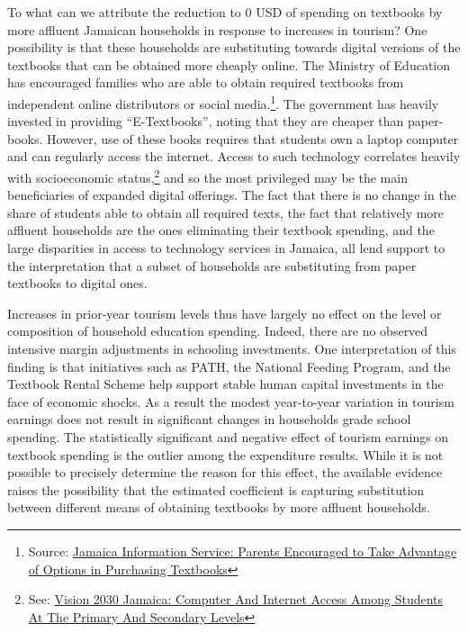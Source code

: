 \documentclass[12pt]{article}
\renewcommand\footnotesize{\fontsize{11}{13}\selectfont}
\begin{document}
   To what can we attribute the reduction to 0 USD of spending on textbooks by more affluent Jamaican households in response to increases in tourism? One possibility is that these households are substituting towards digital versions of the textbooks that can be obtained more cheaply online. The Ministry of Education has encouraged families who are able to obtain required textbooks from independent online distributors or social media.\footnote{\footnotesize Source: \href{https://jis.gov.jm/parents-encouraged-to-take-advantage-of-options-in-purchasing-textbooks/}{Jamaica Information Service: Parents Encouraged to Take Advantage of Options in Purchasing Textbooks}}. The government has heavily invested in providing ``E-Textbooks'', noting that they are cheaper than paper-books. However, use of these books requires that students own a laptop computer and can regularly access the internet. Access to such technology correlates heavily with socioeconomic status,\footnote{\footnotesize See: \href{https://www.vision2030.gov.jm/blog/computer-and-internet-access-among-students-at-the-primary-and-secondary-levels-november-2020/}{Vision 2030 Jamaica: Computer And Internet Access Among Students At The Primary And Secondary Levels}} and so the most privileged may be the main beneficiaries of expanded digital offerings. The fact that there is no change in the share of students able to obtain all required texts, the fact that relatively more affluent households are the ones eliminating their textbook spending, and the large disparities in access to technology services in Jamaica, all lend support to the interpretation that a subset of households are substituting from paper textbooks to digital ones. 
   
   Increases in prior-year tourism levels thus have largely no effect on the level or composition of household education spending. Indeed, there are no observed intensive margin adjustments in schooling investments. One interpretation of this finding is that initiatives such as PATH, the National Feeding Program, and the Textbook Rental Scheme help support stable human capital investments in the face of economic shocks. As a result the modest year-to-year variation in tourism earnings does not result in significant changes in households grade school spending. The statistically significant and negative effect of tourism earnings on textbook spending is the outlier among the expenditure results. While it is not possible to precisely determine the reason for this effect, the available evidence raises the possibility that the estimated coefficient is capturing substitution between different means of obtaining textbooks by more affluent households. 
 
\end{document}
